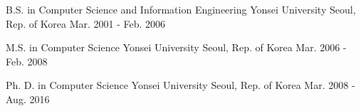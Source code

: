 


\begin{cventries}

  \cventry
    {B.S. in Computer Science and Information Engineering} %
    {Yonsei University} %
    {Seoul, Rep. of Korea} %
    {Mar. 2001 - Feb. 2006} %
    {}


  \cventry
    {M.S. in Computer Science} %
    {Yonsei University} %
    {Seoul, Rep. of Korea} %
    {Mar. 2006 - Feb. 2008} %
    {
    }

  \cventry
    {Ph. D. in Computer Science} %
    {Yonsei University} %
    {Seoul, Rep. of Korea} %
    {Mar. 2008 - Aug. 2016} %
    {
    }
\end{cventries}

